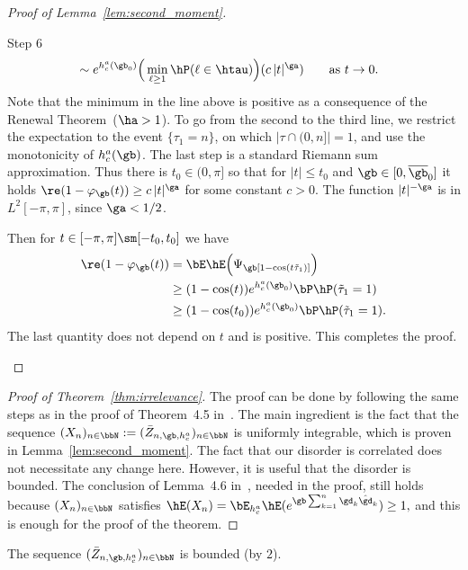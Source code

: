 \begin{proof}[Proof of Lemma~\ref{lem:second_moment}]
\begin{laststep}{Step 6}
\begin{equation}
\begin{aligned}
&\sim e^{h_c^a(\gb_0)} \Big(\min_{\ell\geq1} \hP(\ell \in \htau) \Big) (c \, |t|^\ga) \qquad \text{as } t \to 0.
\end{aligned}
\end{equation}
Note that the minimum in the line above is positive as a consequence of the Renewal Theorem~($\ha > 1$). To go from the second to the third line, we restrict the expectation to the event $\{\tau_1 = n\}$, on which $|\tau \cap (0,n]| = 1$, and use the monotonicity of $h_c^a(\gb)$. The last step is a standard Riemann sum approximation. Thus there is $t_0 \in (0,\pi]$ so that for $|t| \leq t_0$ and $\gb \in [0,\overline\gb_0]$ it holds $\re(1 -
\varphi_\gb(t)) \geq c \, |t|^\ga$ for some constant $c > 0$. The function $|t|^{- \ga}$ is in $L^2[- \pi,\pi]$, since $\ga < 1/2$.

Then for $t \in [- \pi,\pi] \sm [- t_0,t_0]$ we have
\begin{equation}
\begin{aligned}
\re(1 - \varphi_\gb(t)) &= \bE \hE \Big(\Psi_\gb [1 - \cos(t \tilde\tau_1)] \Big)\\
&\geq (1 - \cos(t)) e^{h_c^a(\gb_0)} \bP \hP(\tilde\tau_1 = 1) \\
&\geq (1 - \cos(t_0)) e^{h_c^a(\gb_0)} \bP \hP(\tilde\tau_1 = 1).
\end{aligned}
\end{equation}
The last quantity does not depend on $t$ and is positive. This completes the proof.
\end{laststep}
\let\qed\relax
\end{proof}

\begin{proof}[Proof of Theorem~\ref{thm:irrelevance}]
The proof can be done by following the same steps as in the proof of Theorem~4.5 in~\cite{Gi2011}. The main ingredient is the fact that the sequence $(X_n)_{n\in\bbN} := (\bar Z_{n,\gb,h_c^a})_{n\in\bbN}$ is uniformly integrable, which is proven in Lemma~\ref{lem:second_moment}. The fact that our disorder is correlated does not necessitate any change here. However, it is useful that the disorder is bounded. The conclusion of Lemma~4.6 in~\cite{Gi2011}, needed in the proof, still holds because $(X_n)_{n\in\bbN}$ satisfies $\hE(X_n) = \bE_{h_c^a} \hE(e^{\gb \sum_{k=1}^n \gd_k \hat \gd_k}) \geq 1,$ and this is enough for the proof of the theorem.
\end{proof}

\begin{lemm}\label{lem:bdd.ann.pf.crit}
The sequence $(\bar Z_{n,\gb,h_c^a})_{n\in\bbN}$ is bounded (by $2$).
\end{lemm}

